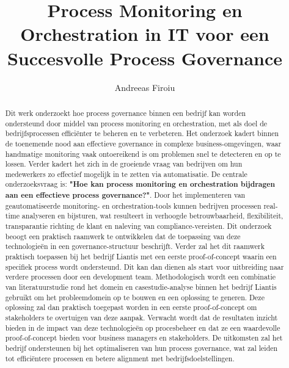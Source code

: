 \documentclass{hogent-article}
\title{Process Monitoring en Orchestration in IT voor een Succesvolle Process Governance}
\author{Andreeas Firoiu}
\begin{document}
\begin{abstract}
  Dit werk onderzoekt hoe process governance binnen een bedrijf kan worden ondersteund door middel van process monitoring en orchestration, met als doel de bedrijfsprocessen efficiënter te beheren en te verbeteren. Het onderzoek kadert binnen de toenemende nood aan effectieve governance in complexe business-omgevingen, waar handmatige monitoring vaak ontoereikend is om problemen snel te detecteren en op te lossen. Verder kadert het zich in de groeiende vraag van bedrijven om hun medewerkers zo effectief mogelijk in te zetten via automatisatie. De centrale onderzoeksvraag is: \textbf{"Hoe kan process monitoring en orchestration bijdragen aan een effectieve process governance?"}. Door het implementeren van geautomatiseerde monitoring- en orchestration-tools kunnen bedrijven processen real-time analyseren en bijsturen, wat resulteert in verhoogde betrouwbaarheid, flexibiliteit, transparantie richting de klant en naleving van compliance-vereisten. Dit onderzoek beoogt een praktisch raamwerk te ontwikkelen dat de toepassing van deze technologieën in een governance-structuur beschrijft. Verder zal het dit raamwerk praktisch toepassen bij het bedrijf Liantis met een eerste proof-of-concept waarin een specifiek process wordt ondersteund. Dit kan dan dienen als start voor uitbreiding naar verdere processen door een development team. Methodologisch wordt een combinatie van literatuurstudie rond het domein en casestudie-analyse binnen het bedrijf Liantis gebruikt om het probleemdomein op te bouwen en een oplossing te generen. Deze oplossing zal dan praktisch toegepast worden in een eerste proof-of-concept om stakeholders te overtuigen van deze aanpak. Verwacht wordt dat de resultaten inzicht bieden in de impact van deze technologieën op procesbeheer en dat ze een waardevolle proof-of-concept bieden voor business managers en stakeholders. De uitkomsten zal het bedrijf ondersteunen bij het optimaliseren van hun process governance, wat zal leiden tot efficiëntere processen en betere alignment met bedrijfsdoelstellingen.
\end{abstract}

\tableofcontents



\printbibliography[heading=bibintoc]
\end{document}
